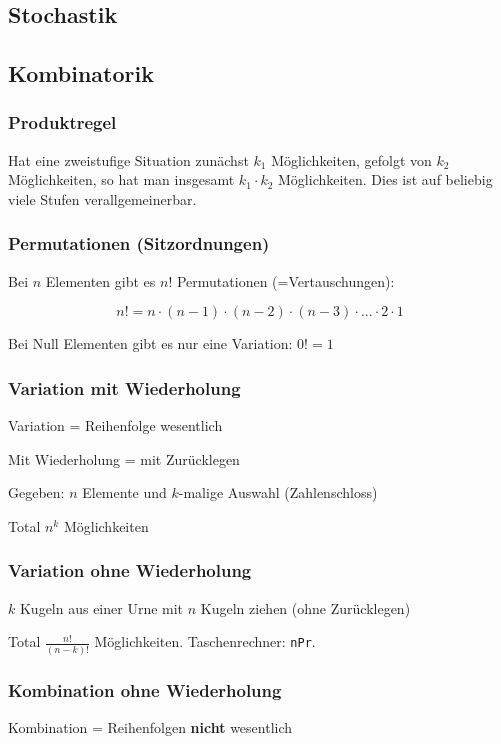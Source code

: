 \begin{multicols}{2}
\section*{Stochastik}

\subsection*{Kombinatorik}

\subsubsection*{Produktregel}
Hat eine zweistufige Situation zunächst $k_1$ Möglichkeiten, gefolgt
von $k_2$ Möglichkeiten, so hat man insgesamt $k_1\cdot{}k_2$
Möglichkeiten. Dies ist auf beliebig viele Stufen verallgemeinerbar.

\subsubsection*{Permutationen (Sitzordnungen)}

Bei $n$ Elementen gibt es $n!$ Permutationen (=Vertauschungen):

\begin{definition*}{}{}
$$n! = n\cdot{}(n-1)\cdot{}(n-2)\cdot{}(n-3)\cdot{} ... \cdot{}2\cdot{}1$$
\end{definition*}

Bei Null Elementen gibt es nur eine Variation: $0! = 1$


\subsubsection*{Variation mit Wiederholung}
Variation = Reihenfolge wesentlich

Mit Wiederholung = mit Zurücklegen

Gegeben: $n$ Elemente und $k$-malige Auswahl
(\zB Zahlenschloss)

Total $n^k$ Möglichkeiten

\subsubsection*{Variation ohne Wiederholung}
$k$ Kugeln aus einer Urne mit $n$ Kugeln ziehen (ohne Zurücklegen)

Total $\frac{n!}{(n-k)!}$ Möglichkeiten. Taschenrechner: \texttt{nPr}. 

\subsubsection*{Kombination ohne Wiederholung}
Kombination = Reihenfolgen \textbf{nicht} wesentlich


\end{multicols}
